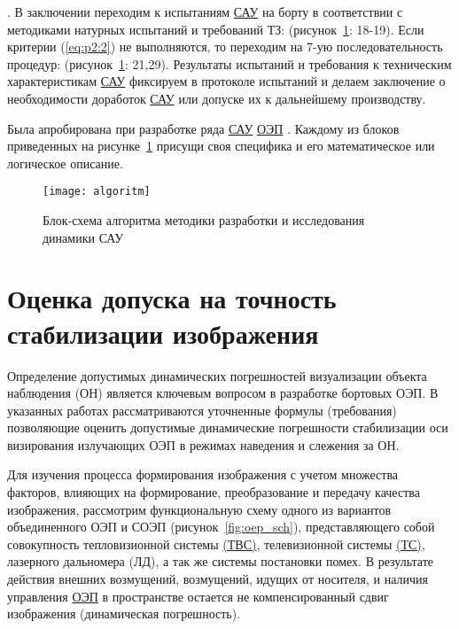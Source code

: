  . В заключении переходим к испытаниям \hyperref[acroSAU]{САУ} на борту в соответствии с методиками натурных испытаний и требований ТЗ: (рисунок~\ref{fig:tikz_example}: 18-19). Если критерии (\ref{eq:p2:2}) не выполняются, то переходим на 7-ую последовательность процедур: (рисунок~\ref{fig:tikz_example}: 21,29). Результаты испытаний и требования к техническим характеристикам \hyperref[acroSAU]{САУ} фиксируем в протоколе испытаний и делаем заключение о необходимости доработок \hyperref[acroSAU]{САУ} или допуске их к дальнейшему производству.

Была апробирована при разработке ряда \hyperref[acroSAU]{САУ} \hyperref[acroEOS]{ОЭП} \cite{Belyakov,Karpov,Baloev16,Karpov17,Gerasin19,Molin21}. Каждому из блоков приведенных на рисунке~\ref{fig:tikz_example} присущи своя специфика и его математическое или логическое описание.

\begin{figure}[ht]
	\centering
	\texttt{[image: algoritm]} 
	\caption{Блок-схема алгоритма методики разработки и исследования динамики САУ}
	\label{fig:tikz_example}
\end{figure}

\newpage

\section{Оценка допуска на точность стабилизации изображения} \label{sec:ch2/sec2}
Определение допустимых динамических погрешностей визуализации объекта наблюдения (ОН) является ключевым вопросом в разработке бортовых ОЭП. В указанных работах \cite{Molin21,Sokolski22,Belyakov} рассматриваются  уточненные формулы  (требования) позволяющие оценить допустимые динамические погрешности  стабилизации оси визирования излучающих ОЭП в режимах наведения и слежения за ОН.

Для изучения процесса формирования изображения с учетом множества факторов, влияющих на формирование, преобразование и передачу качества изображения, рассмотрим функциональную схему одного из вариантов объединенного ОЭП и СОЭП (рисунок~\ref{fig:oep_sch}), представляющего собой совокупность тепловизионной системы \hyperref[acroTVS]{(ТВС)}, телевизионной системы \hyperref[acroTS]{(ТС)}, лазерного дальномера (ЛД), а так же системы постановки помех. В результате действия внешних возмущений, возмущений, идущих от носителя, и наличия управления \hyperref[acroEOS]{ОЭП} в пространстве остается не компенсированный сдвиг изображения (динамическая погрешность).

